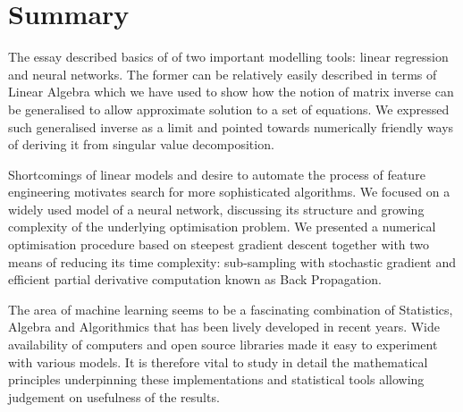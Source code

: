 \documentclass[a4paper,11pt]{article}
\theoremstyle{break}
\begin{document}
\section{Summary}
The essay described basics of of two important modelling tools: linear regression and neural networks.
The former can be relatively easily described in terms of Linear Algebra which we have used to show how the notion of matrix inverse can be generalised to allow approximate solution to a set of equations.
We expressed such generalised inverse as a limit and pointed towards numerically friendly ways of deriving it from singular value decomposition.

Shortcomings of linear models and desire to automate the process of feature engineering motivates search for more sophisticated algorithms.
We focused on a widely used model of a neural network, discussing its structure and growing complexity of the underlying optimisation problem.
We presented a numerical optimisation procedure based on steepest gradient descent together with two means of reducing its time complexity: sub-sampling with stochastic gradient and efficient partial derivative computation known as Back Propagation.

The area of machine learning seems to be a fascinating combination of Statistics, Algebra and Algorithmics that has been lively developed in recent years. Wide availability of computers and open source libraries made it easy to experiment with various models. It is therefore vital to study in detail the mathematical principles underpinning these implementations and statistical tools allowing judgement on usefulness of the results.

\printbibliography
\end{document}
